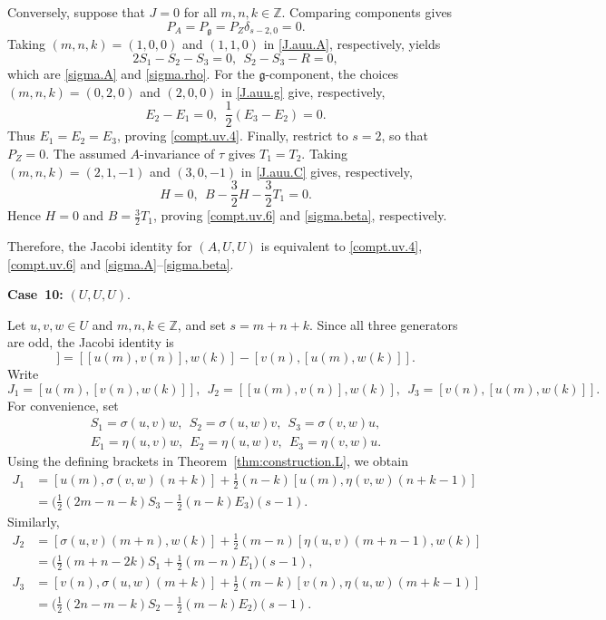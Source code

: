\documentclass[12pt]{article}
\numberwithin{equation}{section}
\theoremstyle{definition}
\theoremstyle{plain}
\newcommand{\bZ}{\ensuremath{\mathbb{Z}}}
\newcommand{\afCase}[1]{\textbf{Case~#1:}}
\newcommand{\fg}{\mathfrak{g}}
\begin{document}
Conversely, suppose that $J=0$ for all $m,n,k\in\bZ$. Comparing components gives
\begin{equation*}
    P_A=P_\fg=P_Z\delta_{s-2,0}=0.
\end{equation*}
Taking $(m,n,k)=(1,0,0)$ and $(1,1,0)$ in \eqref{J.auu.A}, respectively, yields
\begin{equation*}
    2S_1-S_2-S_3=0,\ \  S_2-S_3-R=0,
\end{equation*}
which are \eqref{sigma.A} and \eqref{sigma.rho}.
For the $\fg$-component, the choices $(m,n,k)=(0,2,0)$ and $(2,0,0)$ in \eqref{J.auu.g}
give, respectively,
\begin{equation*}
    E_2-E_1=0,\ \ \frac12(E_3-E_2)=0.
\end{equation*}
Thus $E_1=E_2=E_3$, proving \eqref{compt.uv.4}. Finally, restrict to $s=2$, so that $P_Z=0$. The assumed $A$-invariance of $\tau$ gives $T_1=T_2$. Taking $(m,n,k)=(2,1,-1)$ and $(3,0,-1)$ in \eqref{J.auu.C} gives, respectively,
\begin{equation}
    H=0,\ \ B-\frac32H-\frac32T_1=0.
\end{equation}
Hence $H=0$ and $B=\frac32T_1$, proving \eqref{compt.uv.6} and \eqref{sigma.beta}, respectively.

Therefore, the Jacobi identity for $(A,U,U)$ is equivalent to \eqref{compt.uv.4}, \eqref{compt.uv.6} and \eqref{sigma.A}--\eqref{sigma.beta}.


\afCase{10} $(U,U,U)$.

Let $u,v,w\in U$ and $m,n,k\in\bZ$, and set $s=m+n+k$. Since all three generators are odd, the Jacobi identity is
\begin{equation*}
    [u(m),[v(n),w(k)]]=[[u(m),v(n)],w(k)]-[v(n),[u(m),w(k)]].
\end{equation*}
Write
\begin{equation*}
    J_1=[u(m),[v(n),w(k)]],\ \ J_2=[[u(m),v(n)],w(k)],\ \ J_3=[v(n),[u(m),w(k)]].
\end{equation*}
For convenience, set
\begin{gather*}
    S_1=\sigma(u,v)w,\ \ S_2=\sigma(u,w)v,\ \ S_3=\sigma(v,w)u,\\
    E_1=\eta(u,v)w, \ \ E_2=\eta(u,w)v,\ \ E_3=\eta(v,w)u.
\end{gather*}
Using the defining brackets in Theorem~\ref{thm:construction.L}, we obtain
\begin{align*}
    J_1&=[u(m),\sigma(v,w)(n+k)]+\frac12(n-k)[u(m),\eta(v,w)(n+k-1)]\\
    &=\big(\frac12(2m-n-k)S_3-\frac12(n-k)E_3\big)(s-1).
\end{align*}
Similarly,
\begin{align*}
    J_2&=[\sigma(u,v)(m+n),w(k)]+\frac12(m-n)[\eta(u,v)(m+n-1),w(k)]\\
    &=\big(\frac12(m+n-2k)S_1+\frac12(m-n)E_1\big)(s-1),\\
    J_3&=[v(n),\sigma(u,w)(m+k)]+\frac12(m-k)[v(n),\eta(u,w)(m+k-1)]\\
    &=\big(\frac12(2n-m-k)S_2-\frac12(m-k)E_2\big)(s-1).
\end{align*}
\end{document}
